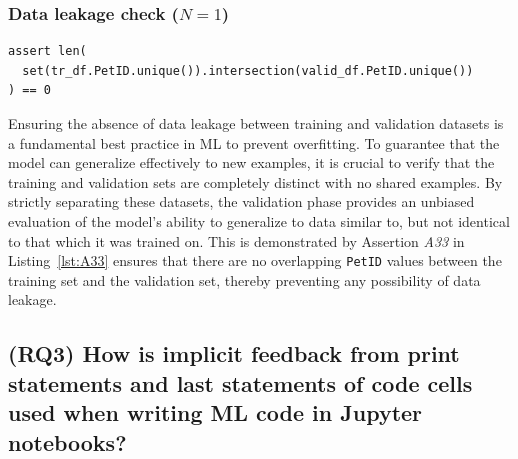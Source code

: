 
\subsubsection{Data leakage check ($N = 1$)}

\begin{lstlisting}[caption={Assertion \emph{A33} used to ensure that the training and validation sets do not contain any overlapping values.}, label={lst:A33}]
assert len(
  set(tr_df.PetID.unique()).intersection(valid_df.PetID.unique())
) == 0
\end{lstlisting}

Ensuring the absence of data leakage between training and validation datasets is a fundamental best practice in ML to prevent overfitting. To guarantee that the model can generalize effectively to new examples, it is crucial to verify that the training and validation sets are completely distinct with no shared examples. By strictly separating these datasets, the validation phase provides an unbiased evaluation of the model's ability to generalize to data similar to, but not identical to that which it was trained on. This is demonstrated by Assertion \emph{A33} in Listing~\ref{lst:A33} ensures that there are no overlapping \lstinline{PetID} values between the training set and the validation set, thereby preventing any possibility of data leakage.


\subsection{(RQ3) How is implicit feedback from print statements and last statements of code cells used when writing ML code in Jupyter notebooks?}~\label{sec:result-implicit}

